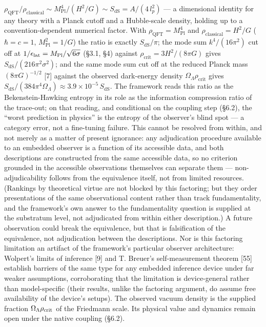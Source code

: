 \documentclass[
]{article}
\begin{document}
\(\rho_{\text{QFT}} / \rho_{\text{classical}} \sim M_{\text{Pl}}^4 / (H^2/G) \sim S_{\text{dS}} = A/(4\,l_p^2)\)
--- a dimensional identity for any theory with a Planck cutoff and a
Hubble-scale density, holding up to a convention-dependent numerical
factor. With \(\rho_{\text{QFT}} = M_{\text{Pl}}^4\) and
\(\rho_{\text{classical}} = H^2/G\) (\(\hbar = c = 1\),
\(M_{\text{Pl}}^2 = 1/G\)) the ratio is exactly \(S_{\text{dS}}/\pi\);
the mode sum \(k^4/(16\pi^2)\) cut off at
\(1/\epsilon_{\rm lat} = M_{\text{Pl}}/\sqrt{6\sigma}\) (§3.1, §4)
against \(\rho_{\text{crit}} = 3H^2/(8\pi G)\) gives
\(S_{\text{dS}}/(216\pi^2\sigma^2)\); and the same mode sum cut off at
the reduced Planck mass \((8\pi G)^{-1/2}\) {[}7{]} against the observed
dark-energy density \(\Omega_\Lambda \rho_{\text{crit}}\) gives
\(S_{\text{dS}}/(384\pi^4\Omega_\Lambda) \approx 3.9 \times 10^{-5}\,S_{\text{dS}}\).
The framework reads this ratio as the Bekenstein-Hawking entropy in its
role as the information compression ratio of the trace-out; on that
reading, and conditional on the coupling step (§6.2), the ``worst
prediction in physics'' is the entropy of the observer's blind spot ---
a category error, not a fine-tuning failure. This cannot be resolved
from within, and not merely as a matter of present ignorance: any
adjudication procedure available to an embedded observer is a function
of its accessible data, and both descriptions are constructed from the
same accessible data, so no criterion grounded in the accessible
observations themselves can separate them --- non-adjudicability follows
from the equivalence itself, not from limited resources. (Rankings by
theoretical virtue are not blocked by this factoring; but they order
presentations of the same observational content rather than track
fundamentality, and the framework's own answer to the fundamentality
question is supplied at the substratum level, not adjudicated from
within either description.) A future observation could break the
equivalence, but that is falsification of the equivalence, not
adjudication between the descriptions. Nor is this factoring limitation
an artifact of the framework's particular observer architecture:
Wolpert's limits of inference {[}9{]} and T. Breuer's self-measurement
theorem {[}55{]} establish barriers of the same type for any embedded
inference device under far weaker assumptions, corroborating that the
limitation is device-general rather than model-specific (their results,
unlike the factoring argument, do assume free availability of the
device's setups). The observed vacuum density is the supplied fraction
\(\Omega_\Lambda\rho_{\rm crit}\) of the Friedmann scale. Its physical
value and dynamics remain open under the native coupling (§6.2).
\end{document}
